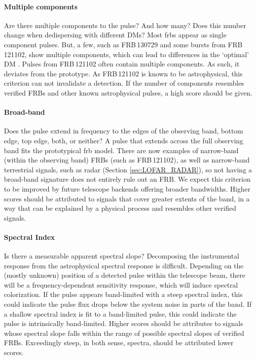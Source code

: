 \documentclass[a4paper,fleqn,usenatbib]{mnras}
\begin{document}
\paragraph{Multiple components}

Are there multiple components to the pulse? And how many? Does this number
change when dedispersing with different DMs? Most \glspl{frb} appear as single
component pulses. But, a few, such as FRB\,130729 and some bursts from
FRB\,121102, show multiple components, which can lead to differences in the
`optimal' DM \citep{2018Natur.553..182M}. Pulses from FRB\,121102 often contain
multiple components. As such, it deviates from the prototype. As FRB\,121102 is
known to be astrophysical, this criterion can not invalidate a detection. If the
number of components resembles verified FRBs and other known astrophysical
pulses, a high score should be given.

\paragraph{Broad-band}

Does the pulse extend in frequency to the edges of the observing band, bottom
edge, top edge, both, or neither? A pulse that extends across the full observing
band fits the prototypical \gls{frb} model. There are now examples of
narrow-band (within the observing band) FRBs (such as FRB\,121102), as well as
narrow-band terrestrial signals, such as radar (Section \ref{sec:LOFAR_RADAR}),
so not having a broad-band signature does not entirely rule out an FRB.  We
expect this criterion to be improved by future telescope backends offering
broader bandwidths. Higher scores should be attributed to signals that cover
greater extents of the band, in a way that can be explained by a physical
process and resembles other verified signals.

\paragraph{Spectral Index}

Is there a measurable apparent spectral slope? Decomposing the instrumental
response from the astrophysical spectral response is difficult.  Depending on
the (mostly unknown) position of a detected pulse within the telescope beam,
there will be a frequency-dependent sensitivity response, which will induce
spectral colorization.  If the pulse appears band-limited with a steep spectral
index, this could indicate the pulse flux drops below the system noise in parts
of the band. If a shallow spectral index is fit to a band-limited pulse, this
could indicate the pulse is intrinsically band-limited. Higher scores should be
attributes to signals whose spectral slope falls within the range of possible
spectral slopes of verified FRBs. Exceedingly steep, in both sense, spectra,
should be attributed lower scores.
\end{document}
